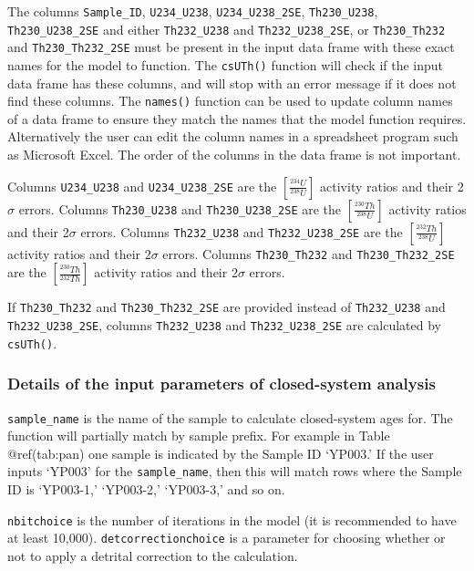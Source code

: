 \documentclass[]{elsarticle} %
\begin{document}
The columns \texttt{Sample\_ID}, \texttt{U234\_U238}, \texttt{U234\_U238\_2SE}, \texttt{Th230\_U238}, \texttt{Th230\_U238\_2SE} and either \texttt{Th232\_U238} and \texttt{Th232\_U238\_2SE}, or \texttt{Th230\_Th232} and \texttt{Th230\_Th232\_2SE} must be present in the input data frame with these exact names for the model to function. The \texttt{csUTh()} function will check if the input data frame has these columns, and will stop with an error message if it does not find these columns. The \texttt{names()} function can be used to update column names of a data frame to ensure they match the names that the model function requires. Alternatively the user can edit the column names in a spreadsheet program such as Microsoft Excel. The order of the columns in the data frame is not important.

Columns \texttt{U234\_U238} and \texttt{U234\_U238\_2SE} are the \([\frac{^{234}U}{^{238}U}]\) activity ratios and their 2\(\sigma\) errors. Columns \texttt{Th230\_U238} and \texttt{Th230\_U238\_2SE} are the \([\frac{^{230}Th}{^{238}U}]\) activity ratios and their 2\(\sigma\) errors. Columns \texttt{Th232\_U238} and \texttt{Th232\_U238\_2SE} are the \([\frac{^{232}Th}{^{238}U}]\) activity ratios and their 2\(\sigma\) errors. Columns \texttt{Th230\_Th232} and \texttt{Th230\_Th232\_2SE} are the \([\frac{^{230}Th}{^{232}Th}]\) activity ratios and their 2\(\sigma\) errors.

If \texttt{Th230\_Th232} and \texttt{Th230\_Th232\_2SE} are provided instead of \texttt{Th232\_U238} and \texttt{Th232\_U238\_2SE}, columns \texttt{Th232\_U238} and \texttt{Th232\_U238\_2SE} are calculated by \texttt{csUTh()}.

\hypertarget{details-of-the-input-parameters-of-closed-system-analysis}{%
\subsubsection{Details of the input parameters of closed-system analysis}\label{details-of-the-input-parameters-of-closed-system-analysis}}

\texttt{sample\_name} is the name of the sample to calculate closed-system ages for. The function will partially match by sample prefix. For example in Table @ref(tab:pan) one sample is indicated by the Sample ID `YP003.' If the user inputs `YP003' for the \texttt{sample\_name}, then this will match rows where the Sample ID is `YP003-1,' `YP003-2,' `YP003-3,' and so on.

\texttt{nbitchoice} is the number of iterations in the model (it is recommended to have at least 10,000).
\texttt{detcorrectionchoice} is a parameter for choosing whether or not to apply a detrital correction to the calculation.
\end{document}
